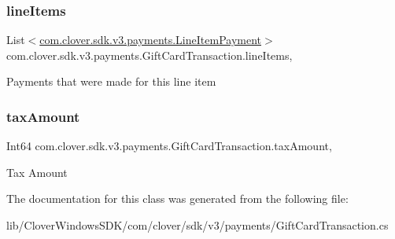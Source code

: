 \subsubsection{\texorpdfstring{line\+Items}{lineItems}}
{\footnotesize\ttfamily List$<$\hyperlink{classcom_1_1clover_1_1sdk_1_1v3_1_1payments_1_1_line_item_payment}{com.\+clover.\+sdk.\+v3.\+payments.\+Line\+Item\+Payment}$>$ com.\+clover.\+sdk.\+v3.\+payments.\+Gift\+Card\+Transaction.\+line\+Items\hspace{0.3cm}{\ttfamily [get]}, {\ttfamily [set]}}



Payments that were made for this line item 

\mbox{\label{classcom_1_1clover_1_1sdk_1_1v3_1_1payments_1_1_gift_card_transaction_a2c46346c29a55029673305b57344326d}} 
\subsubsection{\texorpdfstring{tax\+Amount}{taxAmount}}
{\footnotesize\ttfamily Int64 com.\+clover.\+sdk.\+v3.\+payments.\+Gift\+Card\+Transaction.\+tax\+Amount\hspace{0.3cm}{\ttfamily [get]}, {\ttfamily [set]}}



Tax Amount 



The documentation for this class was generated from the following file\+:\begin{DoxyCompactItemize}
\item 
lib/\+Clover\+Windows\+S\+D\+K/com/clover/sdk/v3/payments/Gift\+Card\+Transaction.\+cs\end{DoxyCompactItemize}

